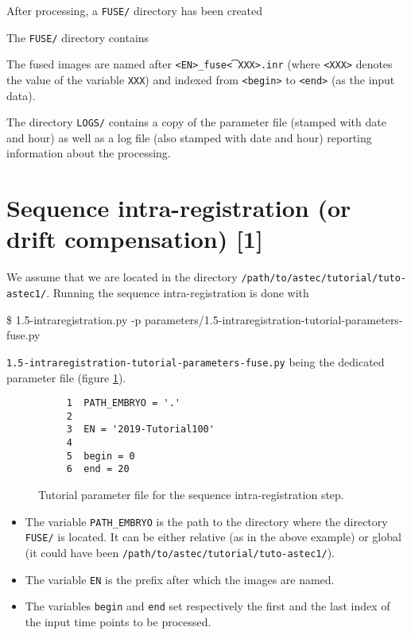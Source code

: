 After processing, a \texttt{FUSE/} directory has been created

\mbox{}
\mbox{}

The \texttt{FUSE/} directory contains 
\mbox{}
\mbox{}

The fused images are named after \texttt{<EN>\_fuse\t<XXX>.inr} (where \texttt{<XXX>}
denotes the value of the variable \texttt{XXX}) and indexed from
\texttt{<begin>} to \texttt{<end>} (as the input data).

The directory \texttt{LOGS/} contains
a copy of the parameter file (stamped with date and hour) as well as a
log file (also stamped with date and hour) reporting information about
the processing.



\section{Sequence intra-registration (or drift compensation) [1]}
\label{sec:tutorial:intra:registration:fuse}

We assume that we are located in the directory
\texttt{/path/to/astec/tutorial/tuto-astec1/}. Running the sequence intra-registration is
done with
\begin{code}{0.8}
  \$ 1.5-intraregistration.py -p parameters/1.5-intraregistration-tutorial-parameters-fuse.py 
\end{code}
\texttt{1.5-intraregistration-tutorial-parameters-fuse.py} being the
dedicated parameter file  (figure \ref{fig:tutorial:parameter:intra:registration:fuse}).

\begin{figure}
\begin{framed}
\begin{verbatim}
     1	PATH_EMBRYO = '.'
     2	
     3	EN = '2019-Tutorial100'
     4	
     5	begin = 0
     6	end = 20
\end{verbatim}
\end{framed}
\caption{\label{fig:tutorial:parameter:intra:registration:fuse} Tutorial
  parameter file for the sequence intra-registration step.}
\end{figure}

\begin{itemize}
  \itemsep -1ex
  \item The variable \texttt{PATH\_EMBRYO} is the path to the directory where
    the directory \texttt{FUSE/} is located. It can be either relative (as in the
    above example) or
    global (it could have been \texttt{/path/to/astec/tutorial/tuto-astec1/}).
  \item The variable \texttt{EN} is the prefix after which the  images
    are named. 
  \item The variables \texttt{begin} and \texttt{end} set respectively the
    first and the last index of the input time points to be processed.
\end{itemize}

